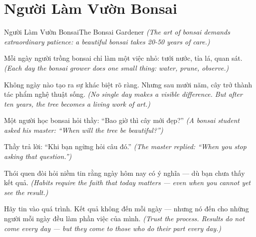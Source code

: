\section{Người Làm Vườn Bonsai}
\begin{truyen}{Người Làm Vườn Bonsai}{The Bonsai Gardener}
\textit{(The art of bonsai demands extraordinary patience: a beautiful bonsai takes 20-50 years of care.)}

Mỗi ngày người trồng bonsai chỉ làm một việc nhỏ: tưới nước, tỉa lá, quan sát.
\textit{(Each day the bonsai grower does one small thing: water, prune, observe.)}

Không ngày nào tạo ra sự khác biệt rõ ràng. Nhưng sau mười năm, cây trở thành tác phẩm nghệ thuật sống.
\textit{(No single day makes a visible difference. But after ten years, the tree becomes a living work of art.)}

Một người học bonsai hỏi thầy: ``Bao giờ thì cây mới đẹp?''
\textit{(A bonsai student asked his master: ``When will the tree be beautiful?'')}

Thầy trả lời: ``Khi bạn ngừng hỏi câu đó.''
\textit{(The master replied: ``When you stop asking that question.'')}

Thói quen đòi hỏi niềm tin rằng ngày hôm nay có ý nghĩa — dù bạn chưa thấy kết quả.
\textit{(Habits require the faith that today matters — even when you cannot yet see the result.)}

\end{truyen}

\begin{baihoc}
Hãy tin vào quá trình. Kết quả không đến mỗi ngày — nhưng nó đến cho những người mỗi ngày đều làm phần việc của mình.
\textit{(Trust the process. Results do not come every day — but they come to those who do their part every day.)}
\end{baihoc}
\ngancach

